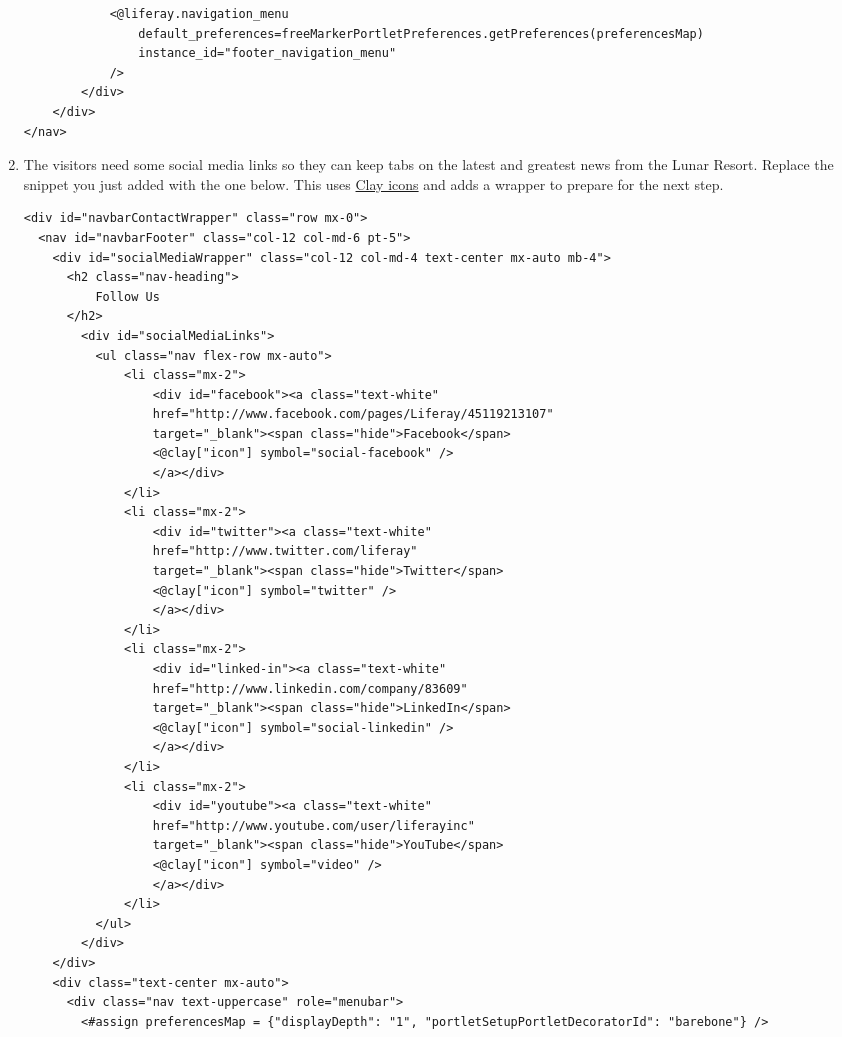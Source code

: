 \begin{enumerate}
\begin{verbatim}
            <@liferay.navigation_menu
                default_preferences=freeMarkerPortletPreferences.getPreferences(preferencesMap)
                instance_id="footer_navigation_menu"
            />
        </div>
    </div>
</nav>
\end{verbatim}
\item
  The visitors need some social media links so they can keep tabs on the
  latest and greatest news from the Lunar Resort. Replace the snippet
  you just added with the one below. This uses
  \href{https://clayui.com/docs/components/icons.html}{Clay icons} and
  adds a wrapper to prepare for the next step.

\begin{verbatim}
<div id="navbarContactWrapper" class="row mx-0">
  <nav id="navbarFooter" class="col-12 col-md-6 pt-5">
    <div id="socialMediaWrapper" class="col-12 col-md-4 text-center mx-auto mb-4">
      <h2 class="nav-heading">
          Follow Us
      </h2>
        <div id="socialMediaLinks">
          <ul class="nav flex-row mx-auto">
              <li class="mx-2">
                  <div id="facebook"><a class="text-white"
                  href="http://www.facebook.com/pages/Liferay/45119213107" 
                  target="_blank"><span class="hide">Facebook</span>
                  <@clay["icon"] symbol="social-facebook" />
                  </a></div>
              </li>
              <li class="mx-2">
                  <div id="twitter"><a class="text-white" 
                  href="http://www.twitter.com/liferay" 
                  target="_blank"><span class="hide">Twitter</span>
                  <@clay["icon"] symbol="twitter" />
                  </a></div>
              </li>
              <li class="mx-2">
                  <div id="linked-in"><a class="text-white"
                  href="http://www.linkedin.com/company/83609" 
                  target="_blank"><span class="hide">LinkedIn</span>
                  <@clay["icon"] symbol="social-linkedin" />
                  </a></div>
              </li>
              <li class="mx-2">
                  <div id="youtube"><a class="text-white"
                  href="http://www.youtube.com/user/liferayinc" 
                  target="_blank"><span class="hide">YouTube</span>
                  <@clay["icon"] symbol="video" />
                  </a></div>
              </li>
          </ul>
        </div>
    </div>
    <div class="text-center mx-auto">
      <div class="nav text-uppercase" role="menubar">
        <#assign preferencesMap = {"displayDepth": "1", "portletSetupPortletDecoratorId": "barebone"} />


\end{verbatim}
\end{enumerate}
